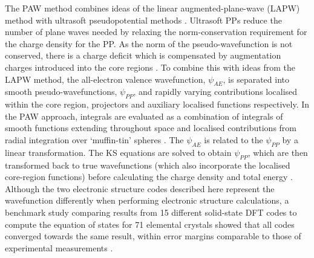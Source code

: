 \documentclass[11pt, twoside]{report}
\begin{document}
The PAW method combines ideas of the linear augmented-plane-wave (LAPW) method \cite{LAPW} with ultrasoft pseudopotential methods \cite{ultrasoft_PP, ultrasoft_PP_VASP, VASP_wiki_PAW}. Ultrasoft PPs reduce the number of plane waves needed by relaxing the norm-conservation requirement for the charge density for the PP. As the norm of the pseudo-wavefunction is not conserved, there is a charge deficit which is compensated by augmentation charges introduced into the core regions \cite{Prasad_ch5}. To combine this with ideas from the LAPW method, the all-electron valence wavefunction, $\psi_{AE}$, is separated into smooth pseudo-wavefunctions, $\psi_{PP}$, and rapidly varying contributions localised within the core region, projectors and auxiliary localised functions respectively. In the PAW approach, integrals are evaluated as a combination of integrals of smooth functions extending throughout space and localised contributions from radial integration over `muffin-tin' spheres \cite{RichardMartin_Ch11}. The $\psi_{AE}$ is related to the $\psi_{PP}$ by a linear transformation. The KS equations are solved to obtain $\psi_{PP}$, which are then transformed back to true wavefunctions (which also incorporate the localised core-region functions) before calculating the charge density and total energy \cite{Prasad_ch5}.
Although the two electronic structure codes described here represent the wavefunction differently when performing electronic structure calculations, a benchmark study comparing results from 15 different solid-state DFT codes to compute the equation of states for 71 elemental crystals showed that all codes converged towards the same result, within error margins comparable to those of experimental measurements \cite{delta_project}. 




\end{document}
